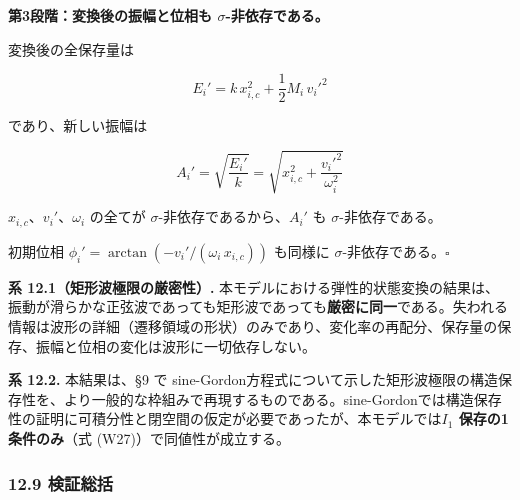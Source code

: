 \documentclass[a4paper,11pt]{ltjsarticle}
\begin{document}
\textbf{第3段階：変換後の振幅と位相も \(\sigma\)-非依存である。}

変換後の全保存量は

\[E_i' = k\,x_{i,c}^2 + \frac{1}{2}M_i\,v_i'^2 \tag{W29}\]

であり、新しい振幅は

\[A_i' = \sqrt{\frac{E_i'}{k}} = \sqrt{x_{i,c}^2 + \frac{v_i'^2}{\omega_i^2}} \tag{W30}\]

\(x_{i,c}\)、\(v_i'\)、\(\omega_i\) の全てが
\(\sigma\)-非依存であるから、\(A_i'\) も \(\sigma\)-非依存である。

初期位相 \(\phi_i' = \arctan(-v_i'/(\omega_i\,x_{i,c}))\) も同様に
\(\sigma\)-非依存である。\(\square\)

\textbf{系 12.1（矩形波極限の厳密性）.}
本モデルにおける弾性的状態変換の結果は、振動が滑らかな正弦波であっても矩形波であっても\textbf{厳密に同一}である。失われる情報は波形の詳細（遷移領域の形状）のみであり、変化率の再配分、保存量の保存、振幅と位相の変化は波形に一切依存しない。

\textbf{系 12.2.} 本結果は、§9 で
sine-Gordon方程式について示した矩形波極限の構造保存性を、より一般的な枠組みで再現するものである。sine-Gordonでは構造保存性の証明に可積分性と閉空間の仮定が必要であったが、本モデルでは\textbf{\(I_1\)
保存の1条件のみ}（式 (W27)）で同値性が成立する。

\subsubsection{12.9 検証総括}\label{ux691cux8a3cux7dcfux62ec}
\end{document}
